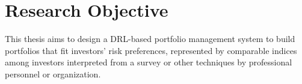 \section {Research Objective}
This thesis aims to design a DRL-based portfolio management system to build portfolios that fit investors' risk preferences, represented by comparable indices among investors interpreted from a survey or other techniques by professional personnel or organization.